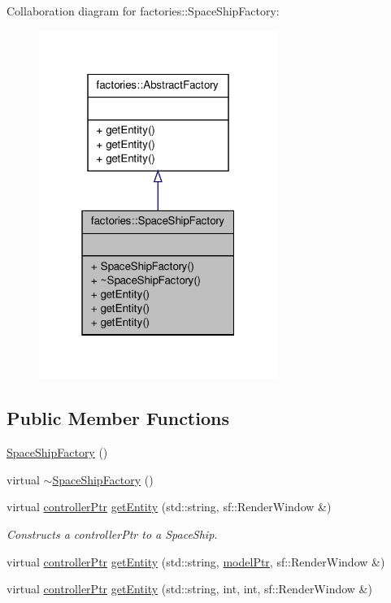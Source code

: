 \-Collaboration diagram for factories\-:\-:\-Space\-Ship\-Factory\-:
\nopagebreak
\begin{figure}[H]
\begin{center}
\leavevmode
\includegraphics[width=220pt]{db/d7a/classfactories_1_1SpaceShipFactory__coll__graph}
\end{center}
\end{figure}
\subsection*{\-Public \-Member \-Functions}
\begin{DoxyCompactItemize}
\item 
\hyperlink{classfactories_1_1SpaceShipFactory_a3afe16a4e7c380ae0a60fd8df21fa076}{\-Space\-Ship\-Factory} ()
\item 
virtual \hyperlink{classfactories_1_1SpaceShipFactory_ae1d253c1354481f99d0144565fc0861a}{$\sim$\-Space\-Ship\-Factory} ()
\item 
virtual \hyperlink{Game_8h_a21b04f6cf2d5990b82725fac5ea2ce9a}{controller\-Ptr} \hyperlink{classfactories_1_1SpaceShipFactory_aff6bc8b01b4205907cff3268715a669d}{get\-Entity} (std\-::string, sf\-::\-Render\-Window \&)
\begin{DoxyCompactList}\small\item\em \-Constructs a controller\-Ptr to a \-Space\-Ship. \end{DoxyCompactList}\item 
virtual \hyperlink{Game_8h_a21b04f6cf2d5990b82725fac5ea2ce9a}{controller\-Ptr} \hyperlink{classfactories_1_1SpaceShipFactory_a82c8c58cb74b30d5c7d1e50f91b93811}{get\-Entity} (std\-::string, \hyperlink{ModelView_8h_a78966ddb517fca8d2b29a2bc5c31e74e}{model\-Ptr}, sf\-::\-Render\-Window \&)
\item 
virtual \hyperlink{Game_8h_a21b04f6cf2d5990b82725fac5ea2ce9a}{controller\-Ptr} \hyperlink{classfactories_1_1SpaceShipFactory_aa52f4097c0d4ffbad9bfe1b9b49eec05}{get\-Entity} (std\-::string, int, int, sf\-::\-Render\-Window \&)
\end{DoxyCompactItemize}


